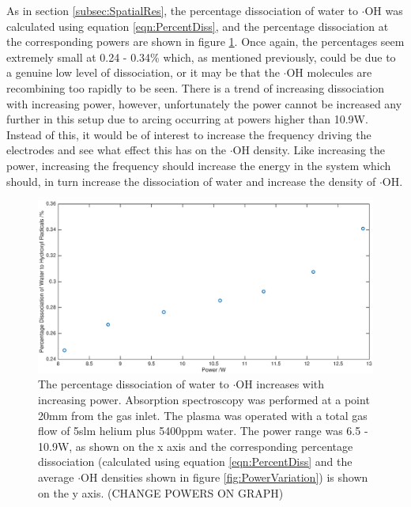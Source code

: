 \documentclass[11pt, oneside]{article}   	%
\begin{document}
As in section \ref{subsec:SpatialRes}, the percentage dissociation of water to $\cdot$OH was calculated using equation \ref{eqn:PercentDiss}, and the percentage dissociation at the corresponding powers are shown in figure \ref{fig:PowerDissociation}.
Once again, the percentages seem extremely small at 0.24 - 0.34\% which, as mentioned previously, could be due to a genuine low level of dissociation, or it may be that the $\cdot$OH molecules are recombining too rapidly to be seen.
There is a trend of increasing dissociation with increasing power, however, unfortunately the power cannot be increased any further in this setup due to arcing occurring at powers higher than 10.9W.
Instead of this, it would be of interest to increase the frequency driving the electrodes and see what effect this has on the $\cdot$OH density.
Like increasing the power, increasing the frequency should increase the energy in the system which should, in turn increase the dissociation of water and increase the density of $\cdot$OH.

\begin{figure}
    \centering
    \includegraphics[width=\textwidth]{Figures/PowerDissociation.eps}
    \caption{The percentage dissociation of water to $\cdot$OH increases with increasing power. Absorption spectroscopy was performed at a point 20mm from the gas inlet. The plasma was operated with a total gas flow of 5slm helium plus 5400ppm water. The power range was 6.5 - 10.9W, as shown on the x axis and the corresponding percentage dissociation (calculated using equation \ref{eqn:PercentDiss} and the average $\cdot$OH densities shown in figure \ref{fig:PowerVariation}) is shown on the y axis. (CHANGE POWERS ON GRAPH)}
    \label{fig:PowerDissociation}
\end{figure}
\end{document}
